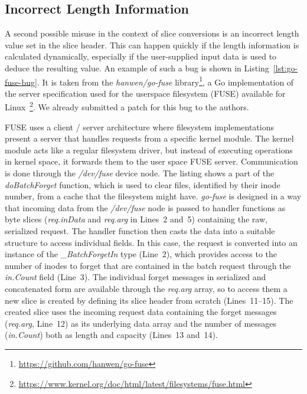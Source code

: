 \subsection{Incorrect Length Information}\label{subsec:unsafe-security-problems:slice-casts:incorrect-length}

A second possible misuse in the context of slice conversions is an incorrect length value set in the slice header.
This can happen quickly if the length information is calculated dynamically, especially if the user-supplied input data
is used to deduce the resulting value.
An example of such a bug is shown in Listing~\ref{lst:go-fuse-bug}.
It is taken from the \textit{hanwen/go-fuse} library\footnote{\url{https://github.com/hanwen/go-fuse}}, a Go
implementation of the server specification used for the userspace filesystem (\acrshort{FUSE}) available for
Linux~\footnote{\url{https://www.kernel.org/doc/html/latest/filesystems/fuse.html}}.
We already submitted a patch for this bug to the authors.



\acrshort{FUSE} uses a client / server architecture where filesystem implementations present a server that handles
requests from a specific kernel module.
The kernel module acts like a regular filesystem driver, but instead of executing operations in kernel space, it
forwards them to the user space \acrshort{FUSE} server.
Communication is done through the \textit{/dev/fuse} device node.
The listing shows a part of the \textit{doBatchForget} function, which is used to clear files, identified by their inode
number, from a cache that the filesystem might have.
\textit{go-fuse} is designed in a way that incoming data from the \textit{/dev/fuse} node is passed to handler functions
as byte slices (\textit{req.inData} and \textit{req.arg} in Lines~2 and~5) containing the raw, serialized request.
The handler function then casts the data into a suitable structure to access individual fields.
In this case, the request is converted into an instance of the \textit{\_BatchForgetIn} type (Line~2), which provides
access to the number of inodes to forget that are contained in the batch request through the \textit{in.Count} field
(Line~3).
The individual forget messages in serialized and concatenated form are available through the \textit{req.arg} array, so
to access them a new slice is created by defining its slice header from scratch (Lines~11--15).
The created slice uses the incoming request data containing the forget messages (\textit{req.arg}, Line~12) as its
underlying data array and the number of messages (\textit{in.Count}) both as length and capacity (Lines~13 and~14).

